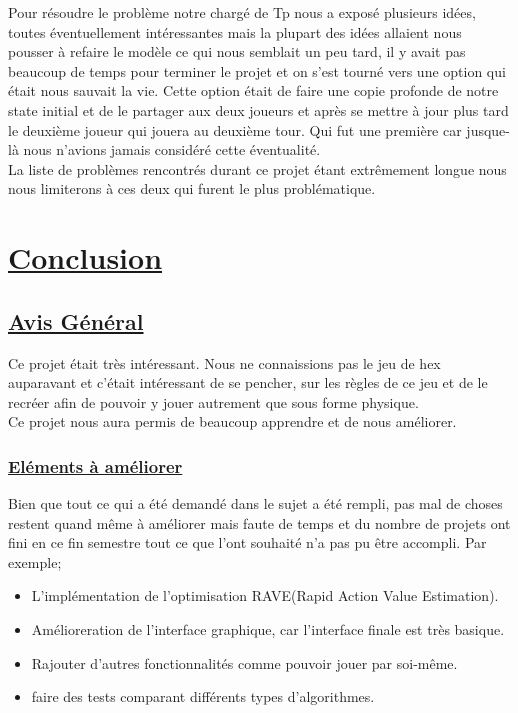 \documentclass[12pt]{article}
\begin{document}
	Pour résoudre le problème notre chargé de Tp nous a exposé plusieurs idées, toutes éventuellement  intéressantes  mais la plupart des idées allaient nous pousser à refaire le modèle ce qui nous semblait un peu tard, il y avait pas beaucoup de temps pour terminer le projet et on s'est tourné vers une option qui était nous sauvait la vie. Cette option était de faire une copie profonde de notre state initial et de le partager aux deux joueurs et après se mettre à jour plus tard le deuxième joueur qui jouera au deuxième tour. Qui fut une première car jusque-là nous n'avions jamais considéré cette éventualité.
 \\
 
	La liste de problèmes rencontrés durant ce projet étant extrêmement longue nous nous limiterons à ces deux qui furent le plus problématique.
	
	\newpage
	\section{\underline{Conclusion}}
	\subsection{\underline{Avis Général}}
	Ce projet était très intéressant. Nous ne connaissions pas le jeu de hex auparavant et c'était intéressant de se pencher, 
	sur les règles de ce jeu et de le recréer afin de pouvoir y jouer autrement que sous forme physique.\\
	Ce projet nous aura permis de beaucoup apprendre et de nous améliorer.
	
	\subsubsection{\underline{Eléments à améliorer}}
	Bien que tout ce qui a été demandé dans le sujet a été rempli, pas mal de choses restent quand même à améliorer mais faute de 
	temps et du nombre de projets ont fini en ce fin semestre tout ce que l'ont souhaité n'a pas pu être accompli.
	Par exemple;
	\begin{itemize}
 		\item L'implémentation de l'optimisation RAVE(Rapid Action Value Estimation).
		\item Amélioreration de  l'interface graphique, car l'interface finale est très basique.
		\item Rajouter d'autres fonctionnalités comme pouvoir jouer par soi-même.
		\item faire des tests comparant différents types d'algorithmes.
	\end{itemize}
\end{document}
